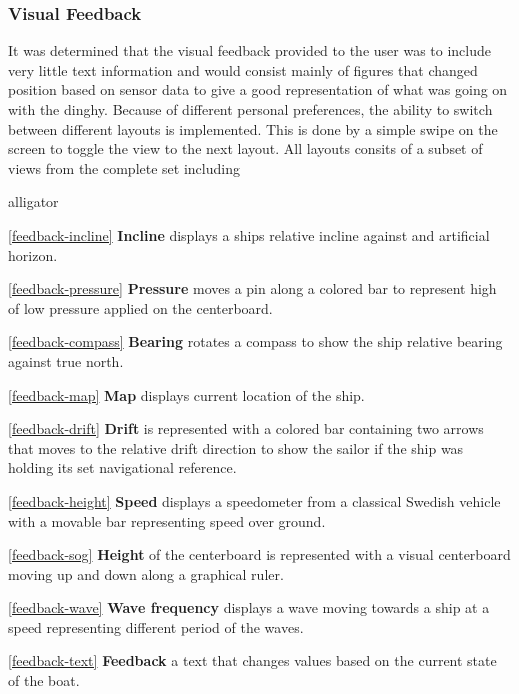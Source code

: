 \subsubsection{Visual Feedback}
It was determined that the visual feedback provided to the user was to include very little text information and would consist mainly of figures that changed position based on sensor data to give a good representation of what was going on with the dinghy. Because of different personal preferences, the ability to switch between different layouts is implemented. This is done by a simple swipe on the screen to toggle the view to the next layout. All layouts consits of a subset of views from the complete set including
\begin{labeling}{alligator}
\item [\ref{feedback-incline} \textbf{Incline}]  displays a ships relative incline against and artificial horizon.
\item [\ref{feedback-pressure} \textbf{Pressure}] moves a pin along a colored bar to represent high of low pressure applied on the centerboard.
\item [\ref{feedback-compass} \textbf{Bearing}] rotates a compass to show the ship relative bearing against true north.
\item [\ref{feedback-map} \textbf{Map}] displays current location of the ship.
\item [\ref{feedback-drift} \textbf{Drift}] is represented with a colored bar containing two arrows that moves to the relative drift direction to show the sailor if the ship was holding its set navigational reference.
\item [\ref{feedback-height} \textbf{Speed}] displays a speedometer from a classical Swedish vehicle\cite{volvo} with a movable bar representing speed over ground.
\item [\ref{feedback-sog} \textbf{Height}] of the centerboard is represented with a visual centerboard moving up and down along a graphical ruler.
\item [\ref{feedback-wave} \textbf{Wave frequency}] displays a wave moving towards a ship at a speed representing different period of the waves.
\item [\ref{feedback-text} \textbf{Feedback}] a text that changes values based on the current state of the boat.
\end{labeling}

